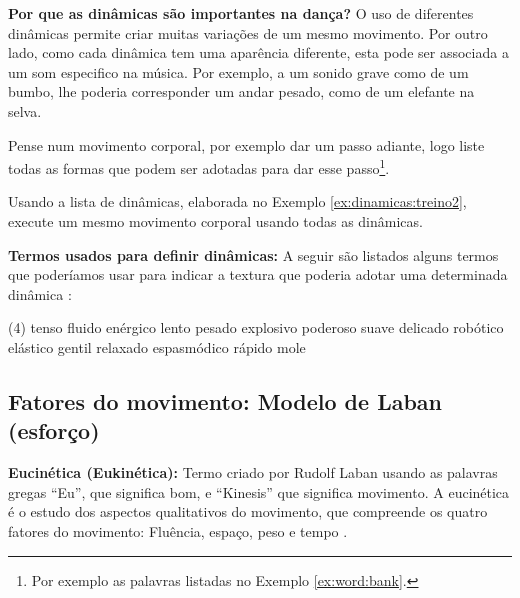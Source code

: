 \begin{tcbinformation} 
\label{ref:importanciadinamicas}
\textbf{Por que as dinâmicas são importantes na dança?}
O uso de diferentes dinâmicas permite criar muitas variações de um mesmo movimento.
Por outro lado, como cada dinâmica tem uma aparência diferente,
esta pode ser associada a um som especifico na música.
Por exemplo, a um sonido grave como de um bumbo,
lhe poderia corresponder um andar pesado, como de um elefante  na selva.
\end{tcbinformation} 

\begin{example}
\label{ex:dinamicas:treino1}
Pense num movimento corporal, por exemplo dar um passo adiante,
logo liste todas as formas que podem ser adotadas para dar esse passo\footnote{Por 
exemplo as palavras listadas no Exemplo \ref{ex:word:bank}.}. 
\end{example}

\begin{example}
\label{ex:dinamicas:treino2}
Usando a lista de dinâmicas, elaborada no Exemplo \ref{ex:dinamicas:treino2},
execute um mesmo movimento corporal usando  todas as dinâmicas.
\end{example}

\begin{example}
\label{ex:word:bank}
\textbf{Termos usados para definir dinâmicas:} 
A seguir são listados alguns termos que poderíamos usar 
para indicar a textura que poderia adotar uma determinada dinâmica \cite[pp. 31]{paine2014complete}:

\begin{tasks}(4)
\task tenso
\task fluido
\task enérgico
\task lento
\task pesado
\task explosivo
\task poderoso
\task suave
\task delicado
\task robótico
\task elástico
\task gentil
\task relaxado
\task espasmódico
\task rápido
\task mole
\end{tasks}
\end{example}


\subsection{Fatores do movimento: Modelo de Laban (esforço)}
\label{subsec:fatordinamica}

\begin{tcbinformation} 
\label{ref:eukinetic}
\textbf{Eucinética (Eukinética):}
Termo criado por Rudolf Laban usando as palavras gregas ``Eu'', que significa bom,
e ``Kinesis'' que significa movimento.
A eucinética é o estudo dos aspectos qualitativos do movimento,
que compreende os quatro fatores do movimento: Fluência,  espaço,  peso  e  tempo 
\cite[pp. 25-26]{elementosdanca2017} \cite[pp. 97]{maletic2011body}.
\end{tcbinformation} 


